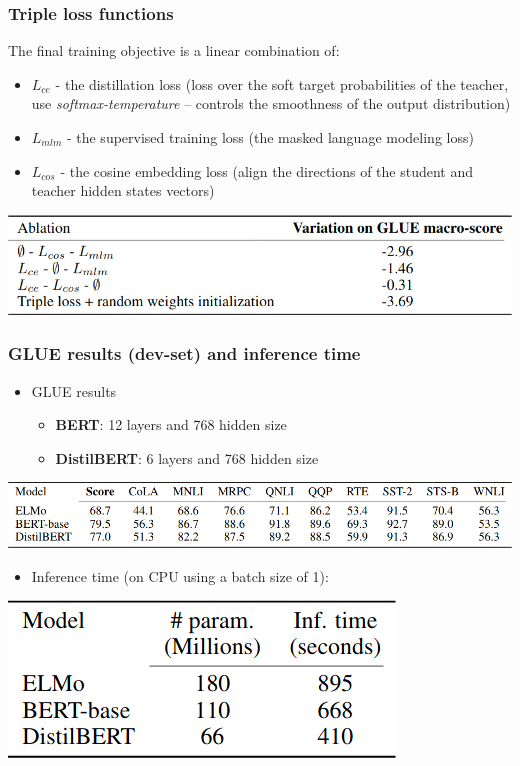 \documentclass{beamer}
\begin{document}
\begin{frame}
    \frametitle{Triple loss functions}
    The final training objective is a linear combination of:
    \begin{itemize}
        \item $ L_{ce} $ - the distillation loss (loss over the soft target probabilities of the teacher, use \textit{softmax-temperature} -- controls the smoothness of the output distribution)
        \item $ L_{mlm} $ - the supervised training loss (the masked language modeling loss)
        \item $ L_{cos} $ - the cosine embedding loss (align the directions of the student and teacher hidden states vectors)
    \end{itemize}
    \begin{center}
        \includegraphics[scale=0.4]{img/distil_bert_ablation.png}
    \end{center}
\end{frame}

\begin{frame}
    \frametitle{GLUE results (dev-set) and inference time}
    \begin{itemize}
      \item GLUE results
      \begin{itemize}
          \item \textbf{BERT}: 12 layers and 768 hidden size
          \item \textbf{DistilBERT}: 6 layers and 768 hidden size
      \end{itemize}
    \end{itemize}
    \begin{center}
        \includegraphics[scale=0.34]{img/distil_bert_glue.png}
    \end{center}
    \begin{itemize}
      \item Inference time (on CPU using a batch size of 1):
    \end{itemize}
    \begin{center}
        \includegraphics[scale=0.36]{img/distil_bert_inference_time.png}
    \end{center}
\end{frame}
\end{document}
